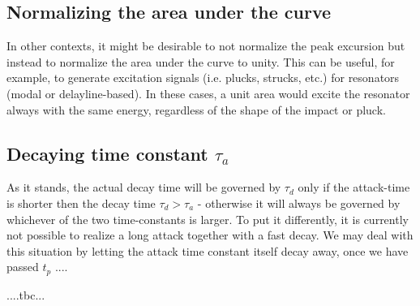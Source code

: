 \subsection{Normalizing the area under the curve}
In other contexts, it might be desirable to not normalize the peak excursion but instead to normalize the area under the curve to unity. This can be useful, for example, to generate excitation signals (i.e. plucks, strucks, etc.) for resonators (modal or delayline-based). In these cases, a unit area would excite the resonator always with the same energy, regardless of the shape of the impact or pluck.


\subsection{Decaying time constant $\tau_a$}
As it stands, the actual decay time will be governed by $\tau_d$ only if the attack-time is shorter then the decay time $\tau_d > \tau_a$ - otherwise it will always be governed by whichever of the two time-constants is larger. To put it differently, it is currently not possible to realize a long attack together with a fast decay. We may deal with this situation by letting the attack time constant itself decay away, once we have passed $t_p$ ....

....tbc...










%
%
%























